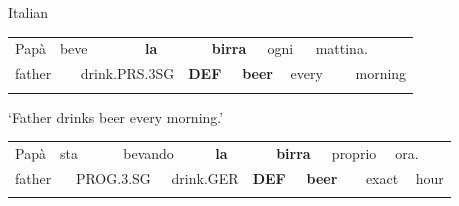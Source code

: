 \begin{listWWNumileveli}
\item {}

\begin{styleExample}
\label{bkm:Ref173317986}Italian

\end{styleExample}

\end{listWWNumileveli}

\begin{listWWNumxliiileveli}
\item {}

\end{listWWNumxliiileveli}

\begin{tabular}{llllllllllll}
\lsptoprule
Papà & \multicolumn{2}{l}{beve

} & \multicolumn{2}{l}{{\bfseries la}

} & \multicolumn{2}{l}{{\bfseries birra}

} & \multicolumn{2}{l}{ogni

} & \multicolumn{2}{l}{mattina.

} & \\
\multicolumn{2}{l}{father

} & \multicolumn{2}{l}{drink.PRS.3SG

} & \multicolumn{2}{l}{{\bfseries DEF}

} & \multicolumn{2}{l}{{\bfseries beer}

} & \multicolumn{2}{l}{every

} & \multicolumn{2}{l}{morning

}\\
\lspbottomrule
\end{tabular}

\begin{styleTranslation}
‘Father drinks beer every morning.’ 

\end{styleTranslation}

\begin{tabular}{llllllllllllll}
\lsptoprule
Papà & \multicolumn{2}{l}{sta

} & \multicolumn{2}{l}{bevando

} & \multicolumn{2}{l}{{\bfseries la}

} & \multicolumn{2}{l}{{\bfseries birra}

} & \multicolumn{2}{l}{proprio

} & \multicolumn{2}{l}{ora.

} & \\
\multicolumn{2}{l}{father

} & \multicolumn{2}{l}{PROG.3.SG

} & \multicolumn{2}{l}{drink.GER

} & \multicolumn{2}{l}{{\bfseries DEF}

} & \multicolumn{2}{l}{{\bfseries beer}

} & \multicolumn{2}{l}{exact

} & \multicolumn{2}{l}{hour

}\\
\lspbottomrule
\end{tabular}

